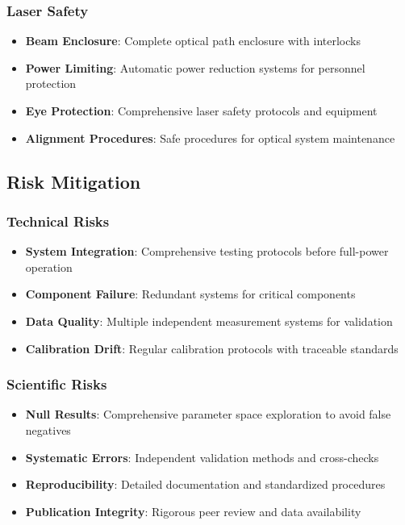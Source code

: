 \documentclass[12pt,a4paper]{article}
\begin{document}
\subsubsection{Laser Safety}
\begin{itemize}
\item \textbf{Beam Enclosure}: Complete optical path enclosure with interlocks
\item \textbf{Power Limiting}: Automatic power reduction systems for personnel protection
\item \textbf{Eye Protection}: Comprehensive laser safety protocols and equipment
\item \textbf{Alignment Procedures}: Safe procedures for optical system maintenance
\end{itemize}

\subsection{Risk Mitigation}

\subsubsection{Technical Risks}
\begin{itemize}
\item \textbf{System Integration}: Comprehensive testing protocols before full-power operation
\item \textbf{Component Failure}: Redundant systems for critical components
\item \textbf{Data Quality}: Multiple independent measurement systems for validation
\item \textbf{Calibration Drift}: Regular calibration protocols with traceable standards
\end{itemize}

\subsubsection{Scientific Risks}
\begin{itemize}
\item \textbf{Null Results}: Comprehensive parameter space exploration to avoid false negatives
\item \textbf{Systematic Errors}: Independent validation methods and cross-checks
\item \textbf{Reproducibility}: Detailed documentation and standardized procedures
\item \textbf{Publication Integrity}: Rigorous peer review and data availability
\end{itemize}
\end{document}
